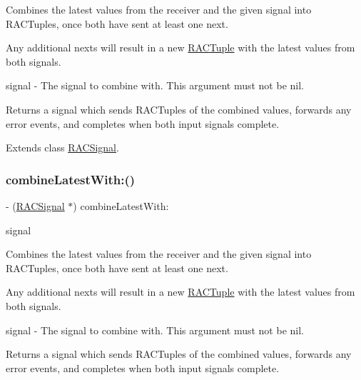 Combines the latest values from the receiver and the given signal into R\+A\+C\+Tuples, once both have sent at least one {\ttfamily next}.

Any additional {\ttfamily next}s will result in a new \mbox{\hyperlink{interface_r_a_c_tuple}{R\+A\+C\+Tuple}} with the latest values from both signals.

signal -\/ The signal to combine with. This argument must not be nil.

Returns a signal which sends R\+A\+C\+Tuples of the combined values, forwards any {\ttfamily error} events, and completes when both input signals complete. 

Extends class \mbox{\hyperlink{interface_r_a_c_signal_afab1b19558df566351cf87e466a5022f}{R\+A\+C\+Signal}}.

\mbox{\label{category_r_a_c_signal_07_operations_08_afab1b19558df566351cf87e466a5022f}} 
\subsubsection{\texorpdfstring{combine\+Latest\+With\+:()}{combineLatestWith:()}\hspace{0.1cm}{\footnotesize\ttfamily [3/3]}}
{\footnotesize\ttfamily -\/ (\mbox{\hyperlink{interface_r_a_c_signal}{R\+A\+C\+Signal}} $\ast$) combine\+Latest\+With\+: \begin{DoxyParamCaption}\item[{(\mbox{\hyperlink{interface_r_a_c_signal}{R\+A\+C\+Signal}} $\ast$)}]{signal }\end{DoxyParamCaption}}

Combines the latest values from the receiver and the given signal into R\+A\+C\+Tuples, once both have sent at least one {\ttfamily next}.

Any additional {\ttfamily next}s will result in a new \mbox{\hyperlink{interface_r_a_c_tuple}{R\+A\+C\+Tuple}} with the latest values from both signals.

signal -\/ The signal to combine with. This argument must not be nil.

Returns a signal which sends R\+A\+C\+Tuples of the combined values, forwards any {\ttfamily error} events, and completes when both input signals complete. 

